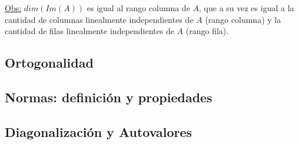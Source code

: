 \underline{Obs:} $dim(Im(A))$ es igual al rango columna de $A$, que a su vez es
igual a la cantidad de columnas linealmente independientes de $A$ (rango columna) y la cantidad de
filas linealmente independientes de $A$ (rango fila).

\subsection{Ortogonalidad}

\subsection{Normas: definición y propiedades}

\subsection{Diagonalización y Autovalores}
